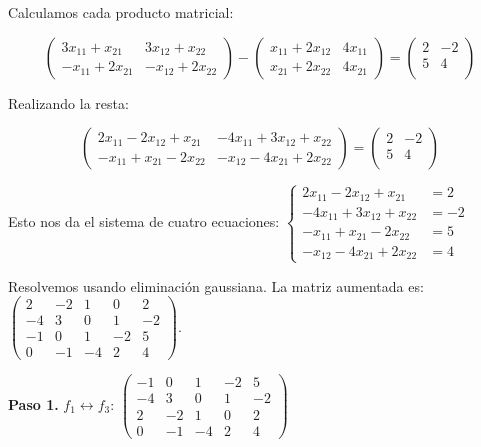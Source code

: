 \begin{prob}
\begin{myproof}
Calculamos cada producto matricial:

$$\left( \begin{array}{cc}
3x_{11} + x_{21} & 3x_{12} + x_{22} \\
-x_{11} + 2x_{21} & -x_{12} + 2x_{22}
\end{array} \right) - \left( \begin{array}{cc}
x_{11} + 2x_{12} & 4x_{11} \\
x_{21} + 2x_{22} & 4x_{21}
\end{array} \right) = \left( \begin{array}{cc}
2&-2\\
5&4\\ \end{array} \right)$$

Realizando la resta:

$$\left( \begin{array}{cc}
2x_{11} - 2x_{12} + x_{21} & -4x_{11} + 3x_{12} + x_{22} \\
-x_{11} + x_{21} - 2x_{22} & -x_{12} - 4x_{21} + 2x_{22}
\end{array} \right) = \left( \begin{array}{cc}
2&-2\\
5&4\\ \end{array} \right)$$

Esto nos da el sistema de cuatro ecuaciones: $\begin{cases}
2x_{11} - 2x_{12} + x_{21} &= 2\\
-4x_{11} + 3x_{12} + x_{22} &= -2\\
-x_{11} + x_{21} - 2x_{22} &= 5\\
-x_{12} - 4x_{21} + 2x_{22} &= 4
\end{cases}$

Resolvemos usando eliminación gaussiana. La matriz aumentada es: $\left(\begin{array}{cccc|c}
2 & -2 & 1 & 0 & 2 \\
-4 & 3 & 0 & 1 & -2 \\
-1 & 0 & 1 & -2 & 5 \\
0 & -1 & -4 & 2 & 4
\end{array}\right).$

\textbf{Paso 1.} $f_1 \leftrightarrow f_3$: $\left(\begin{array}{cccc|c}
-1 & 0 & 1 & -2 & 5 \\
-4 & 3 & 0 & 1 & -2 \\
2 & -2 & 1 & 0 & 2 \\
0 & -1 & -4 & 2 & 4
\end{array}\right)$


\end{myproof}
\end{prob}
